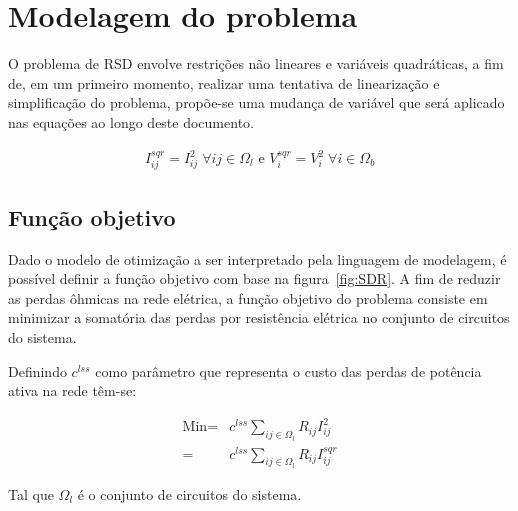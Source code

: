 \section{Modelagem do problema}

O problema de RSD envolve restrições não lineares e variáveis quadráticas, a fim de, em um primeiro momento, realizar uma tentativa de linearização e simplificação do problema, propõe-se uma mudança de variável que será aplicado nas equações ao longo deste documento.

\begin{align}
    I_{ij}^{sqr} = I_{ij}^{2}\;\forall ij \in \Omega_l \text{ e } V_{i}^{sqr} = V_{i}^{2}\; \forall i\in\Omega_b 
    \label{eq:change_variable}
\end{align}



\subsection{Função objetivo}

Dado o modelo de otimização a ser interpretado pela linguagem de modelagem, é possível definir a função objetivo com base na figura~\ref{fig:SDR}.
A fim de reduzir as perdas ôhmicas na rede elétrica, a função objetivo do problema consiste em minimizar a somatória das perdas por resistência elétrica no conjunto de circuitos do sistema.

Definindo $c^{lss}$ como parâmetro que representa o custo das perdas de potência ativa na rede têm-se:

\begin{equation}
    \begin{split}
        \text{Min} = & c^{lss}\sum_{ij\in\Omega_{l}}R_{ij}I_{ij}^{2}\\
        = & c^{lss}\sum_{ij\in\Omega_{l}}R_{ij}I_{ij}^{sqr}
    \end{split}
    \label{eq:funcobjetivo}
\end{equation}

Tal que $\Omega_{l}$ é o conjunto de circuitos do sistema.